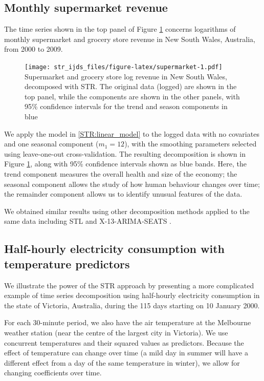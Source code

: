 \documentclass[ijds,nonblindrev]{informs-ijds}
\begin{document}
\hypertarget{ssec:simple}{%
\subsection{Monthly supermarket revenue}\label{ssec:simple}}

The time series shown in the top panel of Figure \ref{fig:supermarket} concerns logarithms of monthly supermarket and grocery store revenue in New South Wales, Australia, from 2000 to 2009.

\begin{figure}[!b]\FIGURE
{\texttt{[image: str\_ijds\_files/figure-latex/supermarket-1.pdf]}}
{\label{fig:supermarket}Supermarket and grocery store log revenue in New South Wales, decomposed with STR. The original data (logged) are shown in the top panel, while the components are shown in the other panels, with 95\% confidence intervals for the trend and season components in blue}
{}
\end{figure}

We apply the model in \eqref{STR:linear_model} to the logged data with no covariates and one seasonal component (\(m_1=12\)), with the smoothing parameters selected using leave-one-out cross-validation. The resulting decomposition is shown in Figure \ref{fig:supermarket}, along with 95\% confidence intervals shown as blue bands. Here, the trend component measures the overall health and size of the economy; the seasonal component allows the study of how human behaviour changes over time; the remainder component allows us to identify unusual features of the data.

We obtained similar results using other decomposition methods applied to the same data including STL \citep{cleveland1990stl} and X-13-ARIMA-SEATS \citep{findley2005some}.


\hypertarget{sec:one_more_example}{%
\subsection{Half-hourly electricity consumption with temperature predictors}\label{sec:one_more_example}}

We illustrate the power of the STR approach by presenting a more complicated example of time series decomposition using half-hourly electricity consumption in the state of Victoria, Australia, during the 115 days starting on 10 January 2000.

For each 30-minute period, we also have the air temperature at the Melbourne weather station (near the centre of the largest city in Victoria). We use concurrent temperatures and their squared values as predictors. Because the effect of temperature can change over time (a mild day in summer will have a different effect from a day of the same temperature in winter), we allow for changing coefficients over time.
\end{document}
